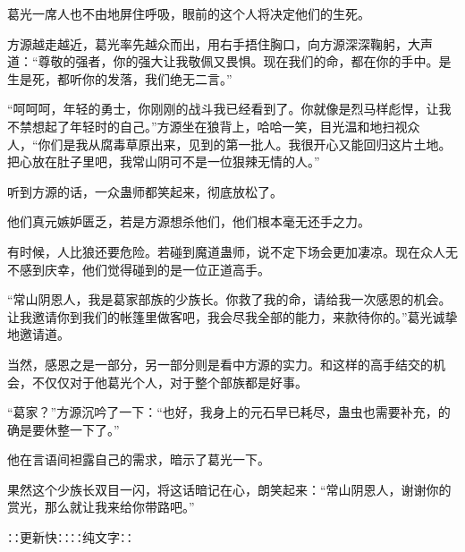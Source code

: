 \begin{this_body}
葛光一席人也不由地屏住呼吸，眼前的这个人将决定他们的生死。

方源越走越近，葛光率先越众而出，用右手捂住胸口，向方源深深鞠躬，大声道：“尊敬的强者，你的强大让我敬佩又畏惧。现在我们的命，都在你的手中。是生是死，都听你的发落，我们绝无二言。”

“呵呵呵，年轻的勇士，你刚刚的战斗我已经看到了。你就像是烈马样彪悍，让我不禁想起了年轻时的自己。”方源坐在狼背上，哈哈一笑，目光温和地扫视众人，“你们是我从腐毒草原出来，见到的第一批人。我很开心又能回归这片土地。把心放在肚子里吧，我常山阴可不是一位狠辣无情的人。”

听到方源的话，一众蛊师都笑起来，彻底放松了。

他们真元嫉妒匮乏，若是方源想杀他们，他们根本毫无还手之力。

有时候，人比狼还要危险。若碰到魔道蛊师，说不定下场会更加凄凉。现在众人无不感到庆幸，他们觉得碰到的是一位正道高手。

“常山阴恩人，我是葛家部族的少族长。你救了我的命，请给我一次感恩的机会。让我邀请你到我们的帐篷里做客吧，我会尽我全部的能力，来款待你的。”葛光诚挚地邀请道。

当然，感恩之是一部分，另一部分则是看中方源的实力。和这样的高手结交的机会，不仅仅对于他葛光个人，对于整个部族都是好事。

“葛家？”方源沉吟了一下：“也好，我身上的元石早已耗尽，蛊虫也需要补充，的确是要休整一下了。”

他在言语间袒露自己的需求，暗示了葛光一下。

果然这个少族长双目一闪，将这话暗记在心，朗笑起来：“常山阴恩人，谢谢你的赏光，那么就让我来给你带路吧。”

∷更新快∷∷纯文字∷

\end{this_body}

